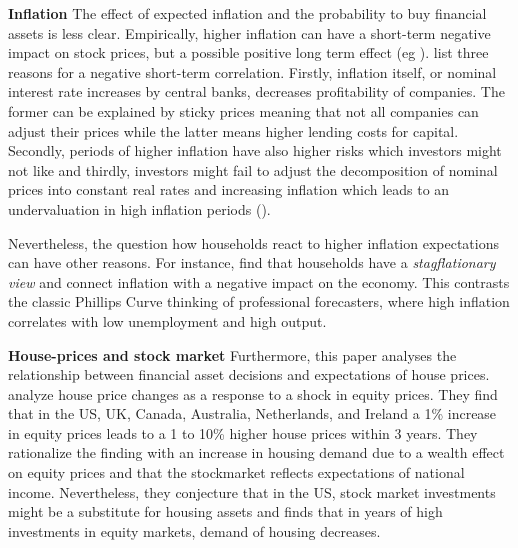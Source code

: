 \documentclass[ProjectABM]{subfiles}
\begin{document}
\textbf{Inflation}
The effect of expected inflation and the probability to buy financial assets is less clear. Empirically, higher inflation can have a short-term negative impact on stock prices, but a possible positive long term effect (eg \cite{anari_kolari_2001inflation}). \cite{campbell_vuolteenaho_2004inflation} list three reasons for a negative short-term correlation. Firstly, inflation itself, or nominal interest rate increases by central banks, decreases profitability of companies. The former can be explained by sticky prices meaning that not all companies can adjust their prices while the latter means higher lending costs for capital. Secondly, periods of higher inflation have also higher risks which investors might not like and thirdly, investors might fail to adjust the decomposition of nominal prices into constant real rates and increasing inflation which leads to an undervaluation in high inflation periods (\cite{modigliani_cohn1979inflation}).

Nevertheless, the question how households react to higher inflation expectations can have other reasons. For instance, \cite{CCG_2020_inflation_communication} find that households have a \textit{stagflationary view} and connect inflation with a negative impact on the economy. This contrasts the classic Phillips Curve thinking of professional forecasters, where high inflation correlates with low unemployment and high output. %


\textbf{House-prices and stock market}
Furthermore, this paper analyses the relationship between financial asset decisions and expectations of house prices. \cite{sutton2002houseprices} analyze house price changes as a response to a shock in equity prices. They find that in the US, UK, Canada, Australia, Netherlands, and Ireland a 1\% increase in equity prices leads to a 1 to 10\% higher house prices within 3 years. They rationalize the finding with an increase in housing demand due to a wealth effect on equity prices and that the stockmarket reflects expectations of national income. Nevertheless, they conjecture that in the US, stock market investments might be a substitute for housing assets and finds that in years of high investments in equity markets, demand of housing decreases. %
\end{document}
